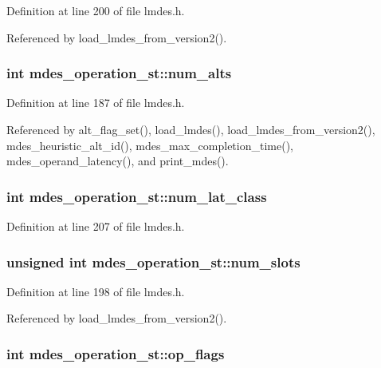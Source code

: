 Definition at line 200 of file lmdes.h.

Referenced by load\_\-lmdes\_\-from\_\-version2().
\subsubsection{\setlength{\rightskip}{0pt plus 5cm}int \bf{mdes\_\-operation\_\-st::num\_\-alts}}\label{structmdes__operation__st_485fec080d34b838ddce7e949621fd8e}




Definition at line 187 of file lmdes.h.

Referenced by alt\_\-flag\_\-set(), load\_\-lmdes(), load\_\-lmdes\_\-from\_\-version2(), mdes\_\-heuristic\_\-alt\_\-id(), mdes\_\-max\_\-completion\_\-time(), mdes\_\-operand\_\-latency(), and print\_\-mdes().
\subsubsection{\setlength{\rightskip}{0pt plus 5cm}int \bf{mdes\_\-operation\_\-st::num\_\-lat\_\-class}}\label{structmdes__operation__st_1dd2ee1a06162463dc5bdc284659ee5f}




Definition at line 207 of file lmdes.h.
\subsubsection{\setlength{\rightskip}{0pt plus 5cm}unsigned int \bf{mdes\_\-operation\_\-st::num\_\-slots}}\label{structmdes__operation__st_7bdff443703ea64f3bb9dda01ae65e52}




Definition at line 198 of file lmdes.h.

Referenced by load\_\-lmdes\_\-from\_\-version2().
\subsubsection{\setlength{\rightskip}{0pt plus 5cm}int \bf{mdes\_\-operation\_\-st::op\_\-flags}}\label{structmdes__operation__st_b0f09c55e6decc77fca4e2b7d24d9980}




